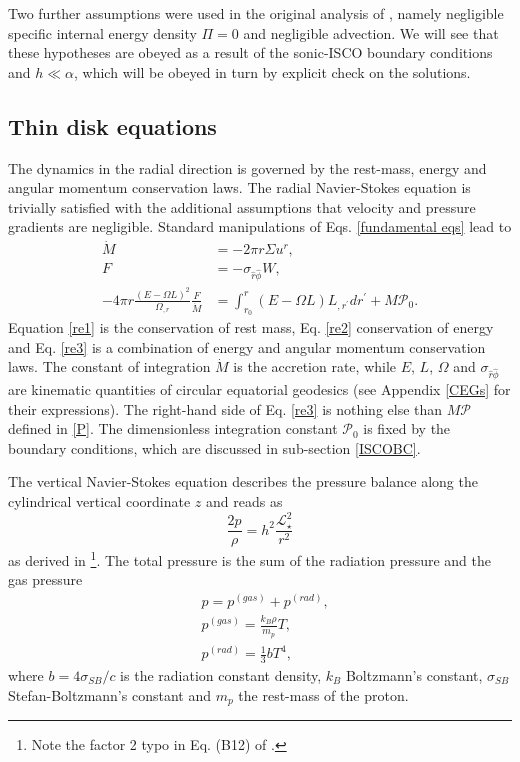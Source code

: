 \documentclass[a4paper,fleqn,usenatbib]{mnrasMOD}
\numberwithin{equation}{section}
\newcommand{\be}{\begin{equation}}
\newcommand{\ee}{\end{equation}}
\begin{document}
Two further assumptions were used in the original analysis of \cite{25334}, namely negligible specific internal energy density $\Pi = 0$ and negligible advection. We will see that these hypotheses are obeyed as a result of the sonic-ISCO boundary conditions and $ h \ll \alpha $, which will be obeyed in turn by explicit check on the solutions.




\subsection{Thin disk equations}\label{sec:3}

The dynamics in the radial direction is governed by the rest-mass, energy and angular momentum conservation laws. The radial Navier-Stokes equation is trivially satisfied with the additional assumptions that velocity and pressure gradients are negligible. Standard manipulations of Eqs. \eqref{fundamental eqs} lead to 
\begin{subequations} 
\begin{align}
\dot{M} &= -2 \pi r \Sigma u^{r}, \label{re1} \\
F &= - \sigma_{\hat{r}\hat{\phi}} W, \label{re2} \\
-4 \pi r \frac{(E - \Omega L)^2}{\Omega_{,r}} \frac{F}{\dot{M}} &= \int_{r_0}^{r}(E - \Omega L)L_{,r^{\prime}} dr^{\prime} + M \mathcal P_0. \label{re3} 
\end{align}
\end{subequations}
Equation \eqref{re1} is the conservation of rest mass, Eq. \eqref{re2} conservation of energy and Eq. \eqref{re3} is a combination of energy and angular momentum conservation laws.
The constant of integration $\dot{M}$ is the accretion rate, while $E$, $L$, $\Omega$ and $\sigma_{\hat{r}\hat{\phi}}$ are kinematic quantities of circular equatorial geodesics (see Appendix \ref{CEGs} for their expressions). 
The right-hand side of Eq. \eqref{re3} is nothing else than $M \mathcal{P}$ defined in \eqref{P}. 
The dimensionless integration constant $\mathcal P_0$ is fixed by the boundary conditions, which are discussed in sub-section \ref{ISCOBC}.

The vertical Navier-Stokes equation describes the pressure balance along the cylindrical vertical coordinate $z$ and reads as
\be   \label{vertical equation1}
\frac{2p}{\rho} = h^2 \frac{\mathcal{L}_{\star}^2}{r^2}
\ee
as derived in \cite{1997ApJ...479..179A}\footnote{Note the factor 2 typo in Eq. (B12) of \cite{Penna:2011rw}.}. The total pressure is the sum of the radiation pressure and the gas pressure 
\begin{subequations}\label{EOS}
\begin{align}
&p = p^{(gas)} + p^{(rad)} ,\\
&p^{(gas)} = \frac{k_B \rho}{m_p} T,\\
&p^{(rad)} =\frac{1}{3} b T^4,
\end{align}
\end{subequations}
where $b = 4\sigma_{SB}/c$ is the radiation constant density, $k_B$ Boltzmann's constant, $\sigma_{SB}$ Stefan-Boltzmann's constant and $m_p$ the rest-mass of the proton.
\end{document}
